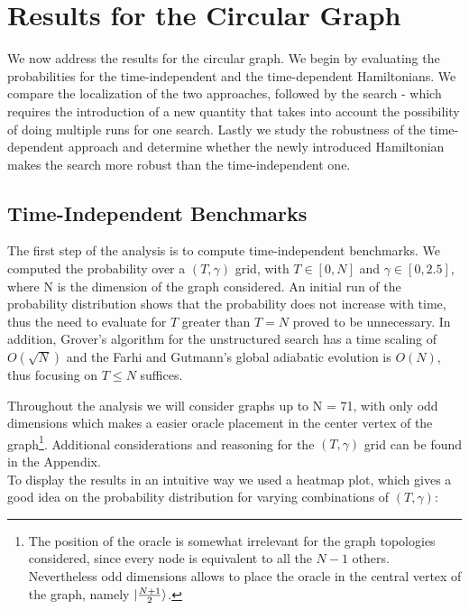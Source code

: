 \section{Results for the Circular Graph}
We now address the results for the circular graph. We begin by evaluating the probabilities for the time-independent and the time-dependent Hamiltonians. We compare the localization of the two approaches, followed by the search - which requires the introduction of a new quantity that takes into account the possibility of doing multiple runs for one search. Lastly we study the robustness of the time-dependent approach and determine whether the newly introduced Hamiltonian makes the search more robust than the time-independent one.

    \subsection{Time-Independent Benchmarks}
        The first step of the analysis is to compute time-independent benchmarks. We computed the probability over a $(T,\gamma)$ grid, with $T\in[0,N]$ and $\gamma\in[0,2.5]$, where N is the dimension of the graph considered. An initial run of the probability distribution shows that the probability does not increase with time, thus the need to evaluate for $T$ greater than $T=N$ proved to be unnecessary. In addition, Grover's algorithm for the unstructured search has a time scaling of $O(\sqrt{N})$ and the Farhi and Gutmann's global adiabatic evolution is $O(N)$, thus focusing on $T \leq N$ suffices.\\
        

        Throughout the analysis we will consider graphs up to N = 71, with only odd dimensions which makes a easier oracle placement in the center vertex of the graph\footnote{The position of the oracle is somewhat irrelevant for the graph topologies considered, since every node is equivalent to all the $N-1$ others. Nevertheless odd dimensions allows to place the oracle in the central vertex of the graph, namely ${|{\frac{N+1}{2}}\rangle}$.}. Additional considerations and reasoning for the $(T,\gamma)$ grid can be found in the Appendix. \\

        \noindent
        To display the results in an intuitive way we used a heatmap plot, which gives a good idea on the probability distribution for varying combinations of $(T,\gamma)$: \\
        

